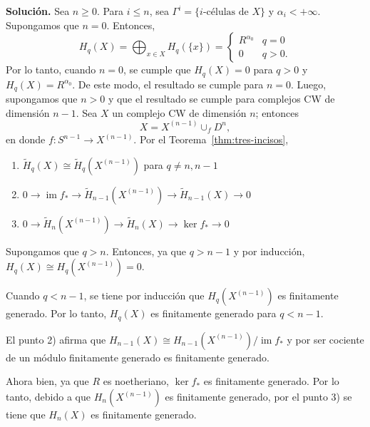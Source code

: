 \documentclass[11pt,a4paper]{article}
\theoremstyle{plain}
\theoremstyle{definition}
\theoremstyle{remark}
\DeclareMathOperator{\im}{im}
\begin{document}
\begin{enumerate}[label=\arabic*.,leftmargin=*]
\noindent\textbf{Solución.} Sea $n\ge0$. Para $i\le n$, sea
$\Gamma^i=\{i\text{-células de }X\}$ y $\alpha_i<+\infty$. Supongamos que
$n=0$. Entonces,
\[
H_q(X)=\bigoplus_{x\in X}H_q(\{x\})=\begin{cases}R^{\alpha_0} & q=0\\0 & q>0.\end{cases}
\]
Por lo tanto, cuando $n=0$, se cumple que $H_q(X)=0$ para $q>0$ y
$H_q(X)=R^{\alpha_0}$. De este modo, el resultado se cumple para $n=0$.
Luego, supongamos que $n>0$ y que el resultado se cumple para complejos CW
de dimensión $n-1$. Sea $X$ un complejo CW de dimensión $n$; entonces
\[
X=X^{(n-1)}\cup_fD^n,
\]
en donde $f:S^{n-1}\to X^{(n-1)}$. Por el Teorema~\ref{thm:tres-incisos},
\begin{enumerate}[label=\arabic*)]
\item $\tilde H_q(X)\cong\tilde H_q(X^{(n-1)})$ para $q\ne n,n-1$
\item $0\to\im f_*\to\tilde H_{n-1}(X^{(n-1)})\to\tilde H_{n-1}(X)\to0$
\item $0\to\tilde H_n(X^{(n-1)})\to\tilde H_n(X)\to\ker f_*\to0$
\end{enumerate}
Supongamos que $q>n$. Entonces, ya que $q>n-1$ y por inducción,
$H_q(X)\cong H_q(X^{(n-1)})=0$.

Cuando $q<n-1$, se tiene por inducción que $H_q(X^{(n-1)})$ es finitamente
generado. Por lo tanto, $H_q(X)$ es finitamente generado para $q<n-1$.

El punto 2) afirma que $H_{n-1}(X)\cong H_{n-1}(X^{(n-1)})/\im f_*$ y por
ser cociente de un módulo finitamente generado es finitamente generado.

Ahora bien, ya que $R$ es noetheriano, $\ker f_*$ es finitamente generado.
Por lo tanto, debido a que $H_n(X^{(n-1)})$ es finitamente generado, por el
punto 3) se tiene que $H_n(X)$ es finitamente generado.


\end{enumerate}
\end{document}
